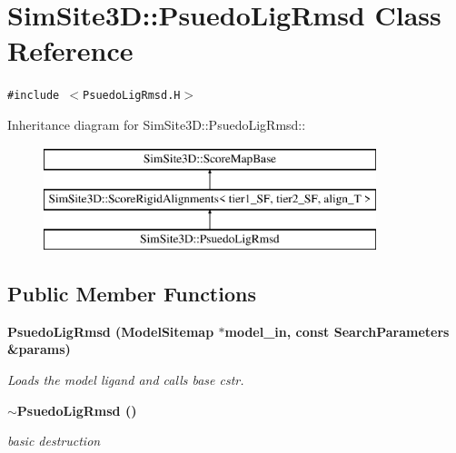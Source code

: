 \section{SimSite3D::Psuedo\-Lig\-Rmsd Class Reference}
\label{classSimSite3D_1_1PsuedoLigRmsd}
{\tt \#include $<$Psuedo\-Lig\-Rmsd.H$>$}

Inheritance diagram for SimSite3D::Psuedo\-Lig\-Rmsd::\begin{figure}[H]
\begin{center}
\leavevmode
\includegraphics[height=3cm]{classSimSite3D_1_1PsuedoLigRmsd}
\end{center}
\end{figure}
\subsection*{Public Member Functions}
\begin{CompactItemize}
\item 
\bf{Psuedo\-Lig\-Rmsd} (\bf{Model\-Sitemap} $\ast$model\_\-in, const \bf{Search\-Parameters} \&params)\label{classSimSite3D_1_1PsuedoLigRmsd_cb2260f005103d3160c017839c4bd06e}

\begin{CompactList}\small\item\em Loads the model ligand and calls base cstr. \item\end{CompactList}\item 
\bf{$\sim$Psuedo\-Lig\-Rmsd} ()\label{classSimSite3D_1_1PsuedoLigRmsd_2ab21999e1e371a9eaa2839251d15d12}

\begin{CompactList}\small\item\em basic destruction \item\end{CompactList}\end{CompactItemize}
